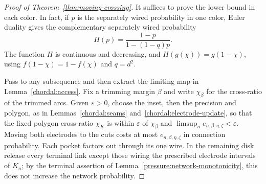 \begin{proof}[Proof of Theorem~\ref{thm:moving-crossing}]
It suffices to prove the lower bound in each color.  In fact,
if $p$ is the separately wired probability in one color, Euler
duality gives the complementary separately wired probability
\begin{equation}\label{chordal:dual-map}
 H(p)=\frac{1-p}{1-(1-q)p}.
\end{equation}
The function $H$ is continuous and decreasing, and
$H(g(\chi))=g(1-\chi)$, using
$f(1-\chi)=1-f(\chi)$ and $q=d^2$.

Pass to any subsequence and then extract the limiting map in
Lemma~\ref{chordal:access}.  Fix a trimming margin $\beta$ and write
$\chi_\beta$ for the cross-ratio of the trimmed arcs.  Given
$\varepsilon>0$, choose the inset, then the precision and polygon,
as in Lemmas~\ref{chordal:seams} and~\ref{chordal:electrode-update},
so that the fixed polygon cross-ratio $\chi_K$ is within
$\varepsilon$ of $\chi_\beta$ and
$\limsup_n e_{n,\beta,\eta,\zeta}<\varepsilon$.
Moving both electrodes to the cuts costs at most
$e_{n,\beta,\eta,\zeta}$ in connection probability.  Each pocket factors
out through its one wire.  In the remaining disk release every
terminal link except those wiring the prescribed electrode
intervals of $K_n$; by the terminal assertion of
Lemma~\ref{pressure:network-monotonicity}, this does not increase the network probability.


\end{proof}
